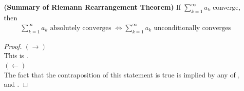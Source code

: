 \documentclass{report}
\begin{document}
\begin{theorem}
\label{t4}
\textbf{(Summary of Riemann Rearrangement Theorem)} If $\sum_{k=1}^\infty a_k$ converge, then 
\begin{align*}
\sum_{k=1}^\infty a_k\text{ absolutely converges }\iff  \sum_{k=1}^\infty a_k\text{ unconditionally converges }
\end{align*}
\end{theorem}
\begin{proof}
$(\longrightarrow)$\\

This is .\\

$(\longleftarrow)$\\

The fact that the contraposition of this  statement is true is implied by any of ,  and . 
\end{proof}
\end{document}
